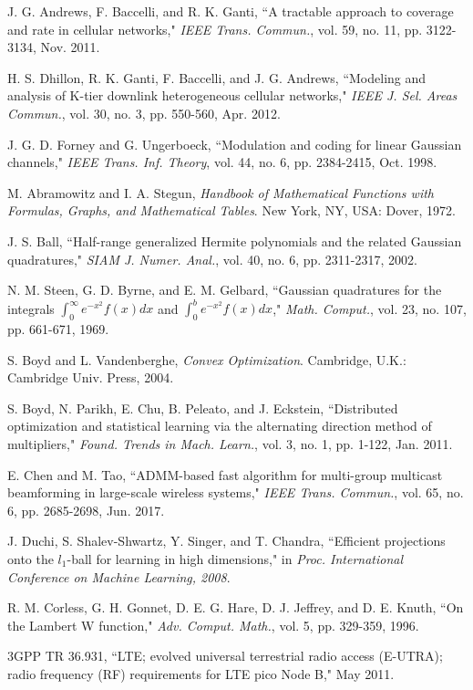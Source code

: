 \documentclass[journal]{IEEEtran}
\begin{document}
\begin{thebibliography}{1}
{ J. G. Andrews, F. Baccelli, and R. K. Ganti, ``A tractable approach to coverage and rate in cellular networks," \emph{IEEE Trans. Commun.},  vol. 59, no. 11, pp. 3122-3134, Nov. 2011.
	
 H. S. Dhillon, R. K. Ganti, F. Baccelli, and J. G. Andrews, ``Modeling and analysis of K-tier downlink heterogeneous cellular networks," \emph{IEEE J. Sel. Areas Commun.},  vol. 30, no. 3, pp. 550-560, Apr. 2012.
}
 J. G. D. Forney and G. Ungerboeck, ``Modulation and coding for linear Gaussian channels," \emph{IEEE Trans. Inf. Theory}, vol. 44, no. 6, pp. 2384-2415, Oct. 1998.

 M. Abramowitz and I. A. Stegun, \emph{Handbook of Mathematical Functions with Formulas, Graphs, and Mathematical Tables}. New York, NY, USA: Dover, 1972.

 J. S. Ball, ``Half-range generalized Hermite polynomials and the related Gaussian quadratures," \emph{SIAM J. Numer. Anal.}, vol. 40, no. 6, pp. 2311-2317, 2002.

 N. M. Steen, G. D. Byrne, and E. M. Gelbard, ``Gaussian quadratures for the integrals $\int_{0}^{\infty} e^{-x^2}f\left(x\right) dx$ and $\int_{0}^{b}e^{-x^2}f\left(x\right)dx$," \emph{Math. Comput.}, vol. 23, no. 107, pp. 661-671, 1969.

 S. Boyd and L. Vandenberghe, \emph{Convex Optimization}. Cambridge, U.K.: Cambridge Univ. Press, 2004.

 S. Boyd, N. Parikh, E. Chu, B. Peleato, and J. Eckstein, ``Distributed optimization and statistical learning via the alternating direction method of multipliers," \emph{Found. Trends in Mach. Learn.}, vol. 3, no. 1, pp. 1-122, Jan. 2011.

 E. Chen and M. Tao, ``ADMM-based fast algorithm for multi-group multicast beamforming in large-scale wireless systems," \emph{IEEE Trans. Commun.}, vol. 65, no. 6, pp. 2685-2698, Jun. 2017.

 J. Duchi, S. Shalev-Shwartz, Y. Singer, and T. Chandra, ``Efficient projections onto the $l_1$-ball for learning in high dimensions," in \emph{Proc. International Conference on Machine Learning, 2008}.

 R. M. Corless, G. H. Gonnet, D. E. G. Hare, D. J. Jeffrey, and D. E. Knuth, ``On the Lambert W function," \emph{Adv. Comput. Math.}, vol. 5, pp. 329-359, 1996.

 3GPP TR 36.931, ``LTE; evolved universal terrestrial radio access (E-UTRA); radio frequency (RF) requirements for LTE pico Node B,"
    May 2011.

\end{thebibliography}
\end{document}
